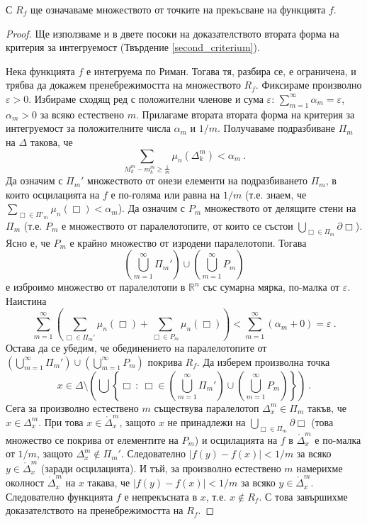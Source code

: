 \documentclass[11pt]{article}
\numberwithin{equation}{section}
\numberwithin{figure}{section}
\numberwithin{table}{section}
\theoremstyle{plain}
\theoremstyle{definition}
\theoremstyle{remark}
\theoremstyle{definition}
\theoremstyle{remark}
\theoremstyle{plain}
\theoremstyle{definition}
\theoremstyle{definition}
\theoremstyle{plain}
\theoremstyle{plain}
\theoremstyle{plain}
\theoremstyle{definition}
\theoremstyle{plain}
\newcommand*{\R}{\mathbb{R}}
\begin{document}
С $R_f$ ще означаваме множеството от точките на прекъсване на функцията $f$.
\medskip

\begin{proof}
Ще използваме и в двете посоки на доказателството втората форма на критерия за интегруемост (Твърдение \ref{second_criterium}).

Нека функцията $f$ е интегруема по Риман. Тогава тя, разбира се, е ограничена, и трябва да докажем пренебрежимостта на множеството $R_f$. Фиксираме произволно $\varepsilon >0$. Избираме сходящ ред с положителни членове и сума $\varepsilon$: $\sum_{m=1}^\infty \alpha_m =\varepsilon$, $\alpha_m >0$ за всяко естествено $m$. Прилагаме втората втората форма на критерия за интегруемост за положителните числа $\alpha_m$ и $1/m$. Получаваме подразбиване $\Pi_m$ на $\Delta$ такова, че
$$\sum_{M_k^m-m_k^m\geq \frac{1}{m}}\mu_n(\Delta_k^m)<\alpha_m \ .$$
Да означим с $\Pi_m'$ множеството от онези елементи на подразбиването $\Pi_m$, в които осцилацията на $f$ е по-голяма или равна на $1/m$ (т.е. знаем, че $\sum_{\Box\in \Pi'_m}\mu_n(\Box)<\alpha_m$). Да означим с $P_m$ множеството от делящите стени на $\Pi_m$ (т.е. $P_m$ е множеството от паралелотопите, от които се състои $\bigcup_{\Box\in \Pi_m}\partial \Box$). Ясно е, че $P_m$ е крайно множество от изродени паралелотопи. Тогава
$$\left(\bigcup_{m=1}^\infty \Pi_m'\right)\cup \left(\bigcup_{m=1}^\infty P_m\right)$$
е изброимо множество от паралелотопи в $\R^n$ със сумарна мярка, по-малка от $\varepsilon$. Наистина
$$\sum_{m=1}^\infty\left(\sum_{\Box\in \Pi_m'}\mu_n(\Box) +\sum_{\Box\in P_m}\mu_n(\Box)\right)< \sum_{m=1}^\infty (\alpha_m +0)=\varepsilon \ .$$
Остава да се убедим, че обединението на паралелотопите от $\left(\bigcup_{m=1}^\infty \Pi_m'\right)\cup \left(\bigcup_{m=1}^\infty P_m\right)$ покрива $R_f$. Да изберем произволна точка 
$$x\in \Delta\setminus \left(\bigcup\left\{\Box \ : \ \Box\in\left(\bigcup_{m=1}^\infty \Pi_m'\right)\cup \left(\bigcup_{m=1}^\infty P_m\right)\right\}\right) \ .$$
Сега за произволно естествено $m$ съществува паралелотоп $\Delta^m_x \in \Pi_m$ такъв, че $x\in \Delta^m_x$. При това $x\in \mathring \Delta^m_x$, защото $x$ не принадлежи на $\bigcup_{\Box\in \Pi_m}\partial \Box$ (това множество се покрива от елементите на $P_m$) и осцилацията на $f$ в $\mathring \Delta^m_x$ е по-малка от $1/m$, защото $\Delta^m_x\not\in \Pi_m'$. Следователно $|f(y)-f(x)|<1/m$ за всяко $y\in \mathring \Delta^m_x$ (заради осцилацията). И тъй, за произволно естествено $m$ намерихме околност $\mathring \Delta^m_x$ на $x$ такава, че $|f(y)-f(x)|<1/m$ за всяко $y\in \mathring \Delta^m_x$. Следователно функцията $f$ е непрекъсната в $x$, т.е. $x\not \in R_f$. С това завършихме доказателството на пренебрежимостта на $R_f$.
\medskip


\end{proof}
\end{document}
